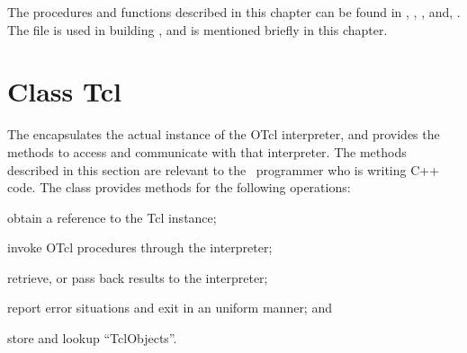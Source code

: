 The procedures and functions described in this chapter can be found in
, , , and,
.
The file  is used in building \ns, and is mentioned
briefly in this chapter.

\section{Class Tcl}
\label{sec:Tcl}

The  encapsulates the actual instance of
the OTcl interpreter, and provides the methods
to access and communicate with that interpreter.
The methods described in this section are relevant to the
\ns\ programmer who is writing C++ code.
The class provides methods for the following operations:
\begin{list}{\textbullet}{}\itemsep0pt
\item obtain a reference to the Tcl instance;
\item invoke OTcl procedures through the interpreter;
\item retrieve, or pass back results to the interpreter;
\item report error situations and exit in an uniform manner; and
\item store and lookup ``TclObjects''.

\end{list}

